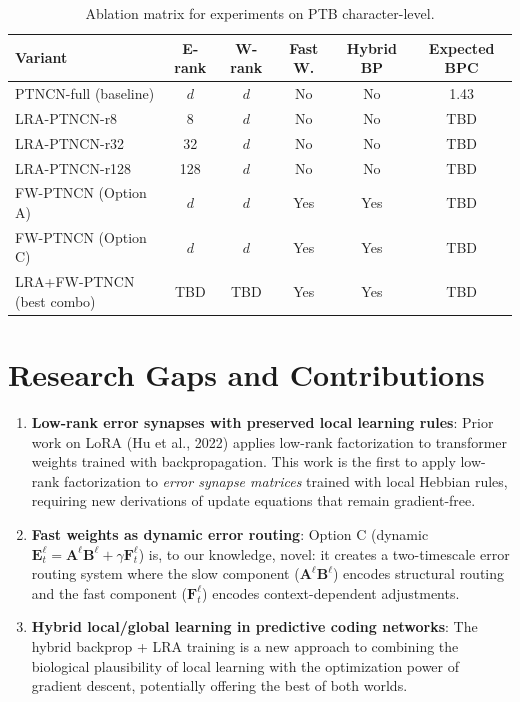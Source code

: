 \documentclass[11pt]{article}
\theoremstyle{definition}
\newcommand{\E}{\mathbf{E}}
\newcommand{\A}{\mathbf{A}}
\newcommand{\B}{\mathbf{B}}
\begin{document}
\begin{table}[h]
\centering
\begin{tabular}{lccccc}
\toprule
\textbf{Variant} & \textbf{E-rank} & \textbf{W-rank} & \textbf{Fast W.} & \textbf{Hybrid BP} & \textbf{Expected BPC} \\
\midrule
PTNCN-full (baseline)     & $d$   & $d$   & No  & No  & 1.43 \\
LRA-PTNCN-r8              & 8     & $d$   & No  & No  & TBD  \\
LRA-PTNCN-r32             & 32    & $d$   & No  & No  & TBD  \\
LRA-PTNCN-r128            & 128   & $d$   & No  & No  & TBD  \\
FW-PTNCN (Option A)       & $d$   & $d$   & Yes & Yes & TBD  \\
FW-PTNCN (Option C)       & $d$   & $d$   & Yes & Yes & TBD  \\
LRA+FW-PTNCN (best combo) & TBD   & TBD   & Yes & Yes & TBD  \\
\bottomrule
\end{tabular}
\caption{Ablation matrix for experiments on PTB character-level.}
\end{table}

\section{Research Gaps and Contributions}

\begin{enumerate}
  \item \textbf{Low-rank error synapses with preserved local learning rules}:
    Prior work on LoRA (Hu et al., 2022) applies low-rank factorization to
    transformer weights trained with backpropagation. This work is the first
    to apply low-rank factorization to \emph{error synapse matrices} trained
    with local Hebbian rules, requiring new derivations of update equations
    that remain gradient-free.

  \item \textbf{Fast weights as dynamic error routing}:
    Option C (dynamic $\E^\ell_t = \A^\ell\B^\ell + \gamma\mathbf{F}^\ell_t$)
    is, to our knowledge, novel: it creates a two-timescale error routing system
    where the slow component ($\A^\ell\B^\ell$) encodes structural routing and
    the fast component ($\mathbf{F}^\ell_t$) encodes context-dependent adjustments.

  \item \textbf{Hybrid local/global learning in predictive coding networks}:
    The hybrid backprop + LRA training is a new approach to combining the
    biological plausibility of local learning with the optimization power of
    gradient descent, potentially offering the best of both worlds.
\end{enumerate}
\end{document}
